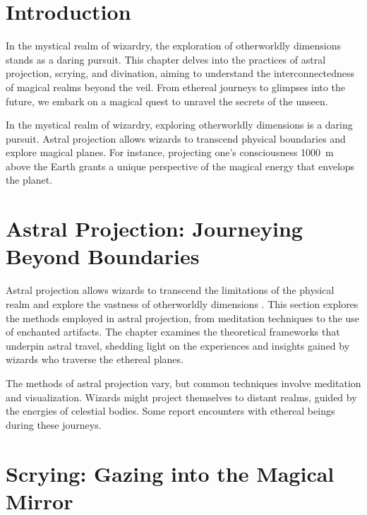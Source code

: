 
\section{Introduction}
In the mystical realm of wizardry, the exploration of otherworldly dimensions stands as a daring pursuit. This chapter delves into the practices of astral projection, scrying, and divination, aiming to understand the interconnectedness of magical realms beyond the veil. From ethereal journeys to glimpses into the future, we embark on a magical quest to unravel the secrets of the unseen.

In the mystical realm of wizardry, exploring otherworldly dimensions is a daring pursuit. Astral projection allows wizards to transcend physical boundaries and explore magical planes. For instance, projecting one's consciousness \SI{1000}{\meter} above the Earth grants a unique perspective of the magical energy that envelops the planet.

\section{Astral Projection: Journeying Beyond Boundaries}
Astral projection allows wizards to transcend the limitations of the physical realm and explore the vastness of otherworldly dimensions \cite{astralprojectionmethods2021}. This section explores the methods employed in astral projection, from meditation techniques to the use of enchanted artifacts. The chapter examines the theoretical frameworks that underpin astral travel, shedding light on the experiences and insights gained by wizards who traverse the ethereal planes.

The methods of astral projection vary, but common techniques involve meditation and visualization. Wizards might project themselves to distant realms, guided by the energies of celestial bodies. Some report encounters with ethereal beings during these journeys.

\section{Scrying: Gazing into the Magical Mirror}

